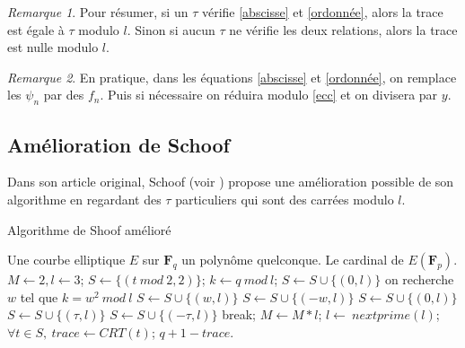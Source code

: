\documentclass{article}%
\theoremstyle{plain}
\theoremstyle{definition}
\theoremstyle{plain}
\theoremstyle{plain}
\theoremstyle{remark}
\newtheorem*{remarque}{Remarque}
\newcommand\fq{\mathbf{F}_{q}}
\begin{document}
\begin{remarque}
Pour résumer, si un $\tau$ vérifie \eqref{abscisse} et \eqref{ordonnée}, alors la trace est égale à $\tau$ modulo $l$. Sinon si aucun $\tau$ ne vérifie les deux relations, alors la trace est nulle modulo $l$.
\end{remarque}

\begin{remarque}
En pratique, dans les équations \eqref{abscisse} et \eqref{ordonnée}, on remplace les $\psi_{n}$ par des $f_{n}$. Puis si nécessaire on réduira modulo \eqref{ecc} et on divisera par $y$.
\end{remarque}

\subsection{Amélioration de Schoof}

Dans son article original, Schoof (voir \cite{ref1}) propose une amélioration possible de son algorithme en regardant des $\tau$ particuliers qui sont des carrées modulo $l$.

\begin{algorithm}[H]
\caption{Algorithme de Shoof amélioré}
\label{schoof2}
\begin{algorithmic} 
\REQUIRE Une courbe elliptique $E$ sur $\fq$ un polynôme quelconque.
\ENSURE Le cardinal de $E(\mathbf{F}_{p})$.
\STATE $M\leftarrow 2, l\leftarrow 3$;
\STATE $S\leftarrow \{(t\ mod\ 2, 2)\}$; 
    \STATE $k\leftarrow q\ mod\ l$;	
            \STATE $S\leftarrow S\cup \{(0, l)\}$
            \ELSE
                \STATE on recherche $w$ tel que $k=w^{2}\ mod\ l$
                    \STATE $S\leftarrow S\cup \{(w, l)\}$ \OR $S\leftarrow S\cup \{(-w, l)\}$ 
                \ELSE
                    \STATE $S\leftarrow S\cup \{(0, l)\}$
                \ENDIF
            \ENDIF
    \ELSE
                \STATE $S\leftarrow S\cup \{(\tau, l)\}$ \OR $S\leftarrow S\cup \{(-\tau, l)\}$ 
                \STATE break;
            \ENDIF
        \ENDFOR
    \ENDIF
    \STATE $M\leftarrow M*l$;
    \STATE $l\leftarrow\ nextprime(l)$; 	
\ENDWHILE
\STATE $\forall t\in S,\ trace\leftarrow CRT(t)$; 
\RETURN $q + 1 - trace$.
\end{algorithmic}
\end{algorithm}
\end{document}
